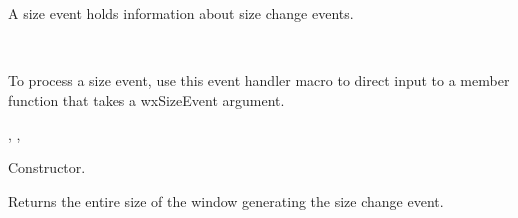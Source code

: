 \section{}\label{wxsizeevent}

A size event holds information about size change events.


\\


To process a size event, use this event handler macro to direct input to a member
function that takes a wxSizeEvent argument.

\twocolwidtha{7cm}
\begin{twocollist}\itemsep=0pt
\end{twocollist}%


, , 




Constructor.

\label{wxsizeeventgetsize}


Returns the entire size of the window generating the size change event.

